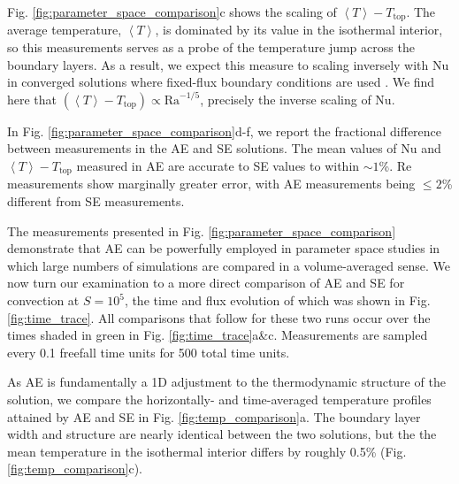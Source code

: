 \documentclass[aps, pre, onecolumn, nofootinbib, notitlepage, groupedaddress, amsfonts, amssymb, amsmath, longbibliography]{revtex4-1}
\newcommand{\angles}[1]{\ensuremath{\left\langle #1 \right\rangle}}
\begin{document}
Fig. \ref{fig:parameter_space_comparison}c shows the scaling of $\angles{T} - T_{\text{top}}$.
The average temperature, $\angles{T}$, is dominated by its value in the isothermal interior,
so this measurements serves as a probe of the temperature jump across the boundary
layers. As a result, we expect this measure to
scaling inversely with Nu in converged solutions
where fixed-flux boundary conditions are used \cite{otero&all2002}.  We find here
that $(\angles{T} - T_{\text{top}}) \propto \text{Ra}^{-1/5}$, precisely the inverse
scaling of Nu.

In Fig. \ref{fig:parameter_space_comparison}d-f, we report the fractional difference
between measurements in the AE and SE solutions.
The mean values of Nu and $\angles{T} - T_{\text{top}}$ 
measured in AE are accurate to SE values to within $\sim 1$\%.
Re measurements show marginally greater error, with AE measurements being 
$\leq 2$\% different from SE measurements.

The measurements presented in Fig. \ref{fig:parameter_space_comparison} demonstrate
that AE can be powerfully employed in parameter space studies in which
large numbers of simulations are compared in a volume-averaged sense.  We now turn
our examination to a more direct comparison of AE and SE for convection at
$S = 10^5$, the time and flux evolution of which was shown in Fig. \ref{fig:time_trace}.
All comparisons that follow for these two runs occur over the times shaded in
green in Fig. \ref{fig:time_trace}a\&c. Measurements are sampled every
0.1 freefall time units for 500 total time units.

As AE is fundamentally a 1D adjustment to the thermodynamic structure of the
solution, we compare the horizontally- and time-averaged temperature profiles 
attained by AE and SE in Fig. \ref{fig:temp_comparison}a.  
The boundary layer width and structure are  
nearly identical between the two solutions, but the
the mean temperature in the isothermal interior differs by roughly 0.5\%
(Fig. \ref{fig:temp_comparison}c). 
\end{document}
